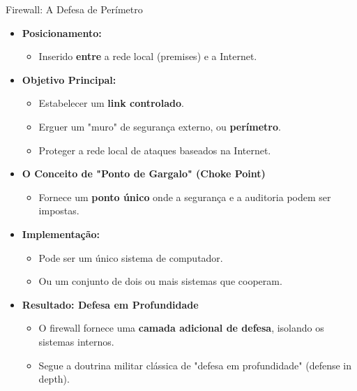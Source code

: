 \begin{frame}{Firewall: A Defesa de Perímetro}
    \begin{itemize}
        \item \textbf{Posicionamento:}
              \begin{itemize}
                  \item Inserido \textbf{entre} a rede local (premises) e a Internet.
              \end{itemize}

        \item \textbf{Objetivo Principal:}
              \begin{itemize}
                  \item Estabelecer um \textbf{link controlado}.
                  \item Erguer um "muro" de segurança externo, ou \textbf{perímetro}.
                  \item Proteger a rede local de ataques baseados na Internet.
              \end{itemize}

        \item \textbf{O Conceito de "Ponto de Gargalo" (Choke Point)}
              \begin{itemize}
                  \item Fornece um \textbf{ponto único} onde a segurança e a auditoria podem ser impostas.
              \end{itemize}

        \item \textbf{Implementação:}
              \begin{itemize}
                  \item Pode ser um único sistema de computador.
                  \item Ou um conjunto de dois ou mais sistemas que cooperam.
              \end{itemize}

        \item \textbf{Resultado: Defesa em Profundidade}
              \begin{itemize}
                  \item O firewall fornece uma \textbf{camada adicional de defesa}, isolando os sistemas internos.
                  \item Segue a doutrina militar clássica de "defesa em profundidade" (defense in depth).
              \end{itemize}
    \end{itemize}
\end{frame}

